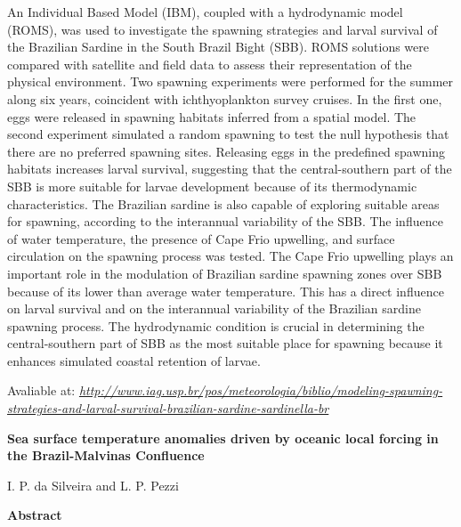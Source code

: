  An Individual Based Model (IBM), coupled with a hydrodynamic model (ROMS), was used to investigate the spawning strategies and larval survival of the Brazilian Sardine in the South Brazil Bight (SBB). 
          ROMS solutions were compared with satellite and field data to assess their representation of the physical environment. Two spawning experiments were performed for the summer along six years, 
          coincident with ichthyoplankton survey cruises. In the first one, eggs were released in spawning habitats inferred from a spatial model. The second experiment simulated a random spawning to test
          the null hypothesis that there are no preferred spawning sites. Releasing eggs in the predefined spawning habitats increases larval survival, suggesting that the central-southern part of the SBB is
          more suitable for larvae development because of its thermodynamic characteristics. The Brazilian sardine is also capable of exploring suitable areas for spawning, according to the interannual
          variability of the SBB. The influence of water temperature, the presence of Cape Frio upwelling, and surface circulation on the spawning process was tested. The Cape Frio upwelling plays an important 
          role in the modulation of Brazilian sardine spawning zones over SBB because of its lower than average water temperature. This has a direct influence on larval survival and on the interannual variability
          of the Brazilian sardine spawning process. The hydrodynamic condition is crucial in determining the central-southern part of SBB as the most suitable place for spawning because it enhances simulated 
          coastal retention of larvae.
\bigskip

\bigskip

 Avaliable at: \textcolor{bleu_cite}{\href{http://www.iag.usp.br/pos/meteorologia/biblio/modeling-spawning-strategies-and-larval-survival-brazilian-sardine-sardinella-br}{\textit{http://www.iag.usp.br/pos/meteorologia/biblio/modeling-spawning-strategies-and-larval-survival-brazilian-sardine-sardinella-br}}}

\bigskip

\newpage
\bigskip

 \begin{center} \textbf{Sea surface temperature anomalies driven by oceanic local forcing in the Brazil-Malvinas Confluence}
\bigskip

 I. P. da Silveira and L. P. Pezzi
\bigskip

 \textbf{Abstract}\end{center}
\bigskip

